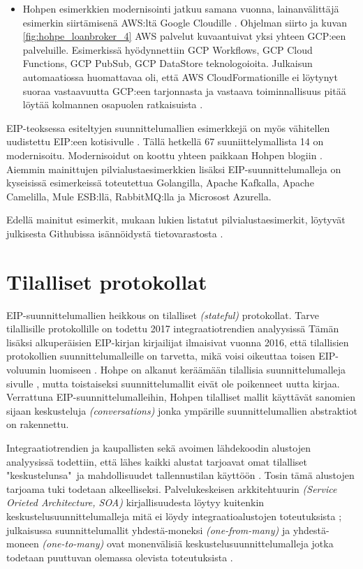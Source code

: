 \begin{itemize}
   \item Hohpen esimerkkien modernisointi jatkuu samana vuonna, lainanvälittäjä esimerkin siirtämisenä AWS:ltä Google Cloudille \citep{HohpeLoanGCP}.
      Ohjelman siirto ja kuvan \ref{fig:hohpe_loanbroker_4} AWS palvelut kuvaantuivat yksi yhteen GCP:een palveluille. Esimerkissä hyödynnettiin GCP Workflows, GCP Cloud Functions, GCP PubSub, GCP DataStore teknologoioita.
      Julkaisun automaatiossa huomattavaa oli, että AWS CloudFormationille ei löytynyt suoraa vastaavuutta GCP:een tarjonnasta ja vastaava toiminnallisuus pitää löytää kolmannen osapuolen ratkaisuista \citep{HohpeLoanGCP}.
   \end{itemize}

   EIP-teoksessa esiteltyjen suunnittelumallien esimerkkejä on myös vähitellen uudistettu EIP:een kotisivulle \citep{conversationPatterns}. Tällä hetkellä 67 suuniittelymallista 14 on modernisoitu. Modernisoidut on koottu yhteen paikkaan Hohpen blogiin \citep{HohpeModernExamples}. Aiemmin mainittujen pilvialustaesimerkkien lisäksi EIP-suunnittelumalleja on kyseisissä esimerkeissä toteutettua Golangilla, Apache Kafkalla, Apache Camelilla, Mule ESB:llä, RabbitMQ:lla ja Microsost Azurella.
   
   Edellä mainitut esimerkit, mukaan lukien listatut pilvialustaesimerkit, löytyvät julkisesta Githubissa isännöidystä tietovarastosta \citep{EIPModernGit}.


\section{Tilalliset protokollat}
EIP-suunnittelumallien heikkous on tilalliset \textit{(stateful)} protokollat. Tarve tilallisille protokollille on todettu 2017 integraatiotrendien analyysissä \citep{Ritter2017} 
Tämän lisäksi alkuperäisien EIP-kirjan kirjailijat ilmaisivat vuonna 2016, että tilallisien protokollien suunnittelumalleille on tarvetta, mikä voisi oikeuttaa toisen EIP-voluumin luomiseen \citep{Zimmermann2016}.
Hohpe on alkanut keräämään tilallisia suunnittelumalleja sivulle \citep{conversationPatterns}, mutta toistaiseksi suunnittelumallit eivät ole poikenneet uutta kirjaa. Verrattuna EIP-suunnittelumalleihin, Hohpen tilalliset mallit käyttävät sanomien sijaan keskusteluja \textit{(conversations)} jonka ympärille suunnittelumallien abstraktiot on rakennettu.


Integraatiotrendien ja kaupallisten sekä avoimen lähdekoodin alustojen  analyysissä todettiin, että lähes kaikki alustat tarjoavat omat tilalliset "keskustelunsa"~ja mahdollisuudet tallennustilan käyttöön \citep{Ritter2017}. Tosin tämä alustojen tarjoama tuki todetaan alkeelliseksi. Palvelukeskeisen arkkitehtuurin \textit{(Service Orieted Architecture, SOA)} kirjallisuudesta löytyy kuitenkin keskustelusuunnittelumalleja mitä ei löydy integraatioalustojen toteutuksista \citep{Ritter2017};
julkaisussa \citep{Barros2005} suunnittelumallit yhdestä-moneksi \textit{(one-from-many)} ja yhdestä-moneen \textit{(one-to-many)} ovat monenvälisiä keskustelusuunnittelumalleja jotka todetaan puuttuvan olemassa olevista toteutuksista \citep{Ritter2017}.

